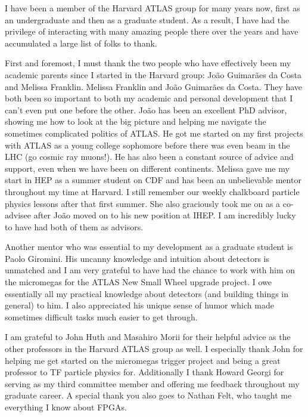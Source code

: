 \begin{doublespace}
\indent I have been a member of the Harvard ATLAS group for many years now, first as an undergraduate and then as a graduate student. As a result, I have had the privilege of interacting with many amazing people there over the years and have accumulated a large list of folks to thank. 

First and foremost, I must thank the two people who have effectively been my academic parents since I started in the Harvard group: Jo\~{a}o Guimar\~{a}es da Costa and Melissa Franklin. Melissa Franklin and Jo\~{a}o Guimar\~{a}es da Costa. They have both been so important to both my academic and personal development that I can't even put one before the other. Jo\~{a}o has been an excellent PhD advisor, showing me how to look at the big picture and helping me navigate the sometimes complicated politics of ATLAS. He got me started on my first projects with ATLAS as a young college sophomore before there was even beam in the LHC (go cosmic ray muons!). He has also been a constant source of advice and support, even when we have been on different continents. Melissa gave me my start in HEP as a summer student on CDF and has been an unbelievable mentor throughout my time at Harvard. I still remember our weekly chalkboard particle physics lessons after that first summer. She also graciously took me on as a co-advisee after Jo\~{a}o moved on to his new position at IHEP. I am incredibly lucky to have had both of them as advisors. 

Another mentor who was essential to my development as a graduate student is Paolo Giromini. His uncanny knowledge and intuition about detectors is unmatched and I am very grateful to have had the chance to work with him on the micromegas for the ATLAS New Small Wheel upgrade project. I owe essentially all my practical knowledge about detectors (and building things in general) to him. I also appreciated his unique sense of humor which made sometimes difficult tasks much easier to get through. 

I am grateful to John Huth and Masahiro Morii for their helpful advice as the other professors in the Harvard ATLAS group as well. I especially thank John for helping me get started on the micromegas trigger project and being a great professor to TF particle physics for. Additionally I thank Howard Georgi for serving as my third committee member and offering me feedback throughout my graduate career. A special thank you also goes to Nathan Felt, who taught me everything I know about FPGAs.


\end{doublespace}
